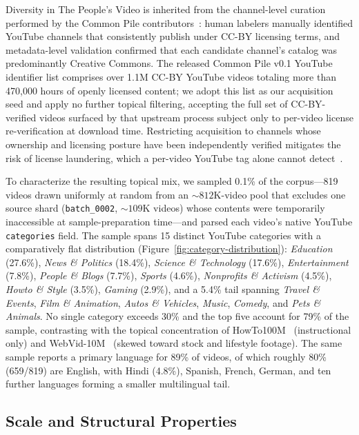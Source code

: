 \documentclass{article}
\begin{document}
Diversity in The People's Video is inherited from the channel-level curation performed by the Common Pile contributors~\cite{kandpal2025commonpile, commonpile_youtube_hf}: human labelers manually identified YouTube channels that consistently publish under CC-BY licensing terms, and metadata-level validation confirmed that each candidate channel's catalog was predominantly Creative Commons. The released Common Pile v0.1 YouTube identifier list comprises over 1.1M CC-BY YouTube videos totaling more than 470{,}000 hours of openly licensed content; we adopt this list as our acquisition seed and apply no further topical filtering, accepting the full set of CC-BY-verified videos surfaced by that upstream process subject only to per-video license re-verification at download time. Restricting acquisition to channels whose ownership and licensing posture have been independently verified mitigates the risk of license laundering, which a per-video YouTube tag alone cannot detect~\cite{kandpal2025commonpile}.

To characterize the resulting topical mix, we sampled 0.1\% of the corpus---819 videos drawn uniformly at random from an ${\sim}812$K-video pool that excludes one source shard (\texttt{batch\_0002}, ${\sim}109$K videos) whose contents were temporarily inaccessible at sample-preparation time---and parsed each video's native YouTube \texttt{categories} field. The sample spans 15 distinct YouTube categories with a comparatively flat distribution (Figure~\ref{fig:category-distribution}): \textit{Education} (27.6\%), \textit{News \& Politics} (18.4\%), \textit{Science \& Technology} (17.6\%), \textit{Entertainment} (7.8\%), \textit{People \& Blogs} (7.7\%), \textit{Sports} (4.6\%), \textit{Nonprofits \& Activism} (4.5\%), \textit{Howto \& Style} (3.5\%), \textit{Gaming} (2.9\%), and a 5.4\% tail spanning \textit{Travel \& Events}, \textit{Film \& Animation}, \textit{Autos \& Vehicles}, \textit{Music}, \textit{Comedy}, and \textit{Pets \& Animals}. No single category exceeds 30\% and the top five account for 79\% of the sample, contrasting with the topical concentration of HowTo100M~\cite{miech2019howto100m} (instructional only) and WebVid-10M~\cite{bain2021frozen} (skewed toward stock and lifestyle footage). The same sample reports a primary language for 89\% of videos, of which roughly 80\% (659/819) are English, with Hindi (4.8\%), Spanish, French, German, and ten further languages forming a smaller multilingual tail.

\subsection{Scale and Structural Properties}
\end{document}
